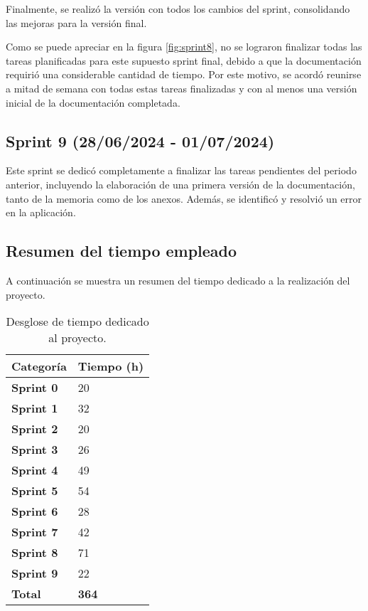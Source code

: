Finalmente, se realizó la versión con todos los cambios del sprint, consolidando las mejoras para la versión final.


Como se puede apreciar en la figura \ref{fig:sprint8}, no se lograron finalizar todas las tareas planificadas para este supuesto sprint final, debido a que la documentación requirió una considerable cantidad de tiempo. Por este motivo, se acordó reunirse a mitad de semana con todas estas tareas finalizadas y con al menos una versión inicial de la documentación completada.

\subsection{Sprint 9 (28/06/2024 - 01/07/2024)}\label{sprint-9}

Este sprint se dedicó completamente a finalizar las tareas pendientes del periodo anterior, incluyendo la elaboración de una primera versión de la documentación, tanto de la memoria como de los anexos. Además, se identificó y resolvió un error en la aplicación.

\subsection{Resumen del tiempo empleado}\label{resumen-del-tiempo-empleado}

A continuación se muestra un resumen del tiempo dedicado a la realización del proyecto.

\begin{table}[h!]
    \centering
    \begin{tabular}{l l}
        \hline
        \textbf{Categoría}      & \textbf{Tiempo (h)} \\
        \hline
        \textbf{Sprint 0}       & 20    \\
        \textbf{Sprint 1}       & 32    \\
        \textbf{Sprint 2}       & 20    \\
        \textbf{Sprint 3}       & 26    \\
        \textbf{Sprint 4}       & 49    \\
        \textbf{Sprint 5}       & 54    \\
        \textbf{Sprint 6}       & 28    \\
        \textbf{Sprint 7}       & 42    \\
        \textbf{Sprint 8}       & 71    \\
        \textbf{Sprint 9}       & 22    \\
        \hline
        \textbf{Total}          & \textbf{364}\\
        \hline
    \end{tabular}
    \caption{Desglose de tiempo dedicado al proyecto.}\label{tabla:tiempo-dedicado-al-proyecto}
\end{table}


